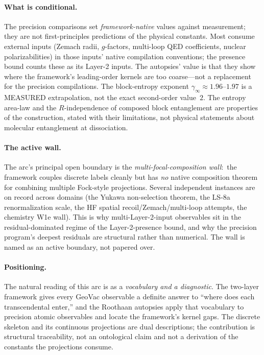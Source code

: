 \documentclass[aps,pra,twocolumn,superscriptaddress,longbibliography,nofootinbib]{revtex4-2}
\begin{document}
\paragraph{What is conditional.}
The precision comparisons set \emph{framework-native} values against
measurement; they are not first-principles predictions of the physical
constants.  Most
consume external inputs (Zemach radii, $g$-factors, multi-loop
QED coefficients, nuclear polarizabilities) in those inputs' native
compilation conventions; the presence bound counts these as its
Layer-2 inputs.  The autopsies' value is that they show where the
framework's leading-order kernels are too coarse---not a replacement for
the precision compilations.  The block-entropy exponent
$\gamma_\infty\approx1.96$--$1.97$ is a MEASURED extrapolation, not the exact
second-order value~$2$.  The entropy area-law and the $R$-independence of
composed block entanglement are properties of the construction, stated
with their limitations, not physical statements about molecular
entanglement at dissociation.

\paragraph{The active wall.}
The arc's principal open boundary is the \emph{multi-focal-composition
wall}:\ the framework couples discrete labels cleanly but has \emph{no}
native composition theorem for combining multiple Fock-style projections.
Several independent instances are on record across domains (the Yukawa
non-selection theorem, the LS-8a renormalization scale, the HF spatial
recoil/Zemach/multi-loop attempts, the chemistry W1e wall).  This is why
multi-Layer-2-input observables sit in the residual-dominated regime of
the Layer-2-presence bound, and why the precision program's deepest
residuals are structural rather than numerical.  The wall is named as an
active boundary, not papered over.

\paragraph{Positioning.}
The natural reading of this arc is as a \emph{vocabulary and a
diagnostic}.  The two-layer framework gives every GeoVac observable a
definite answer to ``where does each transcendental enter,'' and the
Roothaan autopsies apply that vocabulary to precision atomic observables
and locate the framework's kernel gaps.  The discrete skeleton and its continuous projections are
dual descriptions; the contribution is structural traceability, not an
ontological claim and not a derivation of the constants the projections
consume.
\end{document}
